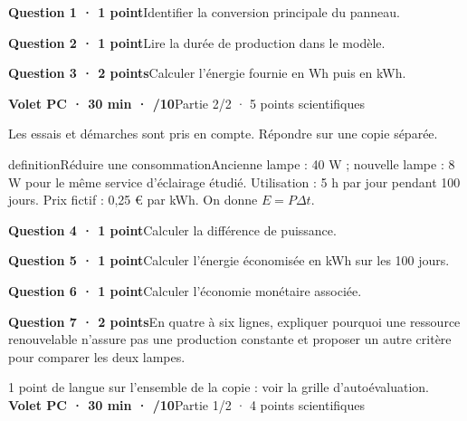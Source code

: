 \par\addvspace{3mm}\noindent\textbf{Question 1 · 1 point}\quad Identifier la conversion principale du panneau.\par
\par\addvspace{3mm}\noindent\textbf{Question 2 · 1 point}\quad Lire la durée de production dans le modèle.\par
\par\addvspace{3mm}\noindent\textbf{Question 3 · 2 points}\quad Calculer l’énergie fournie en Wh puis en kWh.\par
\vfill{}
\noindent\textbf{Volet PC · 30 min · /10}\hfill Partie 2/2 · 5 points scientifiques
\par\vspace{2mm}Les essais et démarches sont pris en compte. Répondre sur une copie séparée.\par
\begin{pcEncadre}{definition}{Réduire une consommation}Ancienne lampe : 40 W ; nouvelle lampe : 8 W pour le même service d’éclairage étudié. Utilisation : 5 h par jour pendant 100 jours. Prix fictif : 0,25 € par kWh. On donne $E=P\Delta t$.\end{pcEncadre}
\par\addvspace{3mm}\noindent\textbf{Question 4 · 1 point}\quad Calculer la différence de puissance.\par
\par\addvspace{3mm}\noindent\textbf{Question 5 · 1 point}\quad Calculer l’énergie économisée en kWh sur les 100 jours.\par
\par\addvspace{3mm}\noindent\textbf{Question 6 · 1 point}\quad Calculer l’économie monétaire associée.\par
\par\addvspace{3mm}\noindent\textbf{Question 7 · 2 points}\quad En quatre à six lignes, expliquer pourquoi une ressource renouvelable n’assure pas une production constante et proposer un autre critère pour comparer les deux lampes.\par
\vfill{}
{\small 1 point de langue sur l’ensemble de la copie : voir la grille d’autoévaluation.}
\label{bb-9}
\noindent\textbf{Volet PC · 30 min · /10}\hfill Partie 1/2 · 4 points scientifiques
